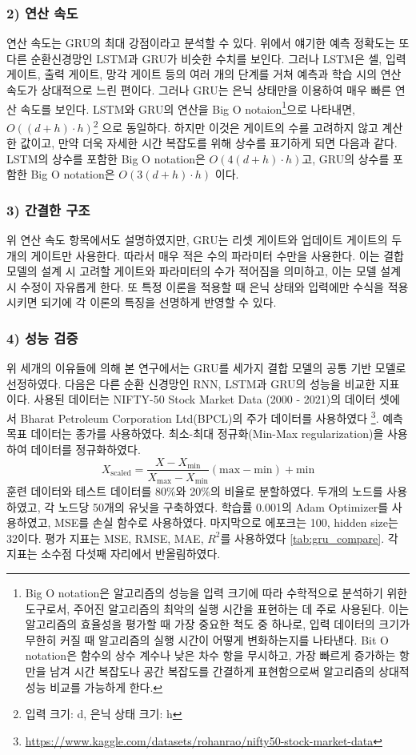 \documentclass[11pt]{report}
\begin{document}
\subsubsection*{2) 연산 속도}
연산 속도는 GRU의 최대 강점이라고 분석할 수 있다. 
위에서 얘기한 예측 정확도는 또 다른 순환신경망인 LSTM과 GRU가 비슷한 수치를 보인다. 
그러나 LSTM은 셀, 입력 게이트, 출력 게이트, 망각 게이트 등의 여러 개의 단계를 거쳐 예측과 학습 시의 연산 속도가 상대적으로 느린 편이다.
그러나 GRU는 은닉 상태만을 이용하여 매우 빠른 연산 속도를 보인다. 
LSTM와 GRU의 연산을 Big O notaion\footnote{Big O notation은 알고리즘의 성능을 입력 크기에 따라 수학적으로 분석하기 위한 도구로서, 주어진 알고리즘의 최악의 실행 시간을 표현하는 데 주로 사용된다. 
이는 알고리즘의 효율성을 평가할 때 가장 중요한 척도 중 하나로, 입력 데이터의 크기가 무한히 커질 때 알고리즘의 실행 시간이 어떻게 변화하는지를 나타낸다. 
Bit O notation은 함수의 상수 계수나 낮은 차수 항을 무시하고, 가장 빠르게 증가하는 항만을 남겨 시간 복잡도나 공간 복잡도를 간결하게 표현함으로써 알고리즘의 상대적 성능 비교를 가능하게 한다.}으로 나타내면, 
$O((d + h) \cdot h)$\footnote{입력 크기: d, 은닉 상태 크기: h}
으로 동일하다. 하지만 이것은 게이트의 수를 고려하지 않고 계산한 값이고, 만약 더욱 자세한 시간 복잡도를 위해 상수를 표기하게 되면 다음과 같다. 
LSTM의 상수를 포함한 Big O notation은 
$O(4(d + h) \cdot h)$고, 
GRU의 상수를 포함한 Big O notation은 
$O(3(d + h) \cdot h)$ 이다. 

\subsubsection*{3) 간결한 구조}
위 연산 속도 항목에서도 설명하였지만, GRU는 리셋 게이트와 업데이트 게이트의 두개의 게이트만 사용한다. 
따라서 매우 적은 수의 파라미터 수만을 사용한다. 
이는 결합 모델의 설계 시 고려할 게이트와 파라미터의 수가 적어짐을 의미하고, 이는 모델 설계 시 수정이 자유롭게 한다. 
또 특정 이론을 적용할 때 은닉 상태와 입력에만 수식을 적용시키면 되기에 각 이론의 특징을 선명하게 반영할 수 있다. 

\subsubsection*{4) 성능 검증}
\indent 위 세개의 이유들에 의해 본 연구에서는 GRU를 세가지 결합 모델의 공통 기반 모델로 선정하였다. 
다음은 다른 순환 신경망인 RNN, LSTM과 GRU의 성능을 비교한 지표이다. 
사용된 데이터는 NIFTY-50 Stock Market Data (2000 - 2021)의 데이터 셋에서 Bharat Petroleum Corporation Ltd(BPCL)의 주가 데이터를 사용하였다 \footnote{ \url{https://www.kaggle.com/datasets/rohanrao/nifty50-stock-market-data} }. 
예측 목표 데이터는 종가를 사용하였다.
최소-최대 정규화(Min-Max regularization)을 사용하여 데이터를 정규화하였다. 
$$
X_{\text{scaled}} = \frac{X - X_{\text{min}}}{X_{\text{max}} - X_{\text{min}}} (\text{max} - \text{min}) + \text{min}
$$
훈련 데이터와 테스트 데이터를 80\%와 20\%의 비율로 분할하였다. 
두개의 노드를 사용하였고, 각 노드당 50개의 유닛을 구축하였다. 
학습률 0.001의 Adam Optimizer를 사용하였고, MSE를 손실 함수로 사용하였다. 
마지막으로 에포크는 100, hidden size는 32이다. 
평가 지표는 MSE, RMSE, MAE, $R^2$를 사용하였다 \autoref{tab:gru_compare}. 
각 지표는 소수점 다섯째 자리에서 반올림하였다. 
\end{document}

